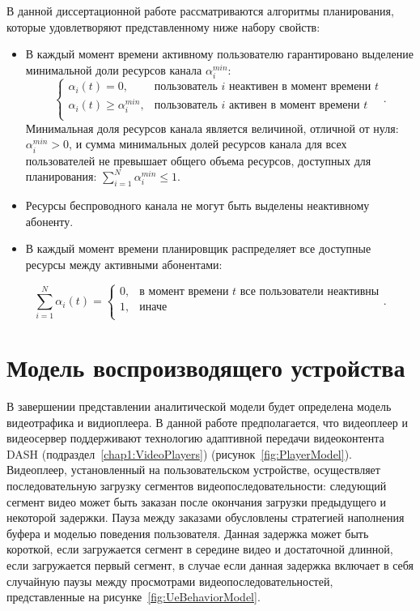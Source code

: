 В данной диссертационной работе рассматриваются алгоритмы планирования, которые удовлетворяют представленному ниже набору свойств:
\begin{itemize}
	\item В каждый момент времени активному пользователю гарантировано выделение минимальной доли ресурсов канала $\alpha_{i}^{min}$:
	\begin{equation}
		\label{eq:MinGuarPart}
		\begin{cases}
			\alpha_i(t) = 0, & \text{пользователь $i$ неактивен в момент времени $t$} \\
			\alpha_i(t) \geq \alpha_{i}^{min}, & \text{пользователь $i$ активен в момент времени $t$}\\
		\end{cases}.
	\end{equation}
	Минимальная доля ресурсов канала является величиной, отличной от нуля: $\alpha_{i}^{min} > 0$, и сумма минимальных долей ресурсов канала для всех пользователей не превышает общего объема ресурсов, доступных для планирования: $\sum\limits_{i=1}^{N}\alpha_{i}^{min} \leq 1$.
	\item Ресурсы беспроводного канала не могут быть выделены неактивному абоненту.
	\item В каждый момент времени планировщик распределяет все доступные ресурсы между активными абонентами:
\end{itemize}
\begin{equation}
	\label{eq:AllResources}
	\sum\limits_{i=1}^{N}\alpha_{i}(t) =
	\begin{cases}
		0, & \text{в момент времени $t$ все пользователи неактивны} \\
		1, & \text{иначе}\\
	\end{cases}.
\end{equation}

\section{Модель воспроизводящего устройства}
\label{chap2:VideoTrafficModel}

В завершении представлении аналитической модели будет определена модель видеотрафика и видиоплеера. В данной работе предполагается, что видеоплеер и видеосервер поддерживают технологию адаптивной передачи видеоконтента DASH (подраздел~\ref{chap1:VideoPlayers}) (рисунок~\ref{fig:PlayerModel}). Видеоплеер, установленный на пользовательском устройстве, осуществляет последовательную загрузку сегментов видеопоследовательности: следующий сегмент видео может быть заказан после окончания загрузки предыдущего и некоторой задержки. Пауза между заказами обусловлены стратегией наполнения буфера и моделью поведения пользователя. Данная задержка может быть короткой, если загружается сегмент в середине видео и достаточной длинной, если загружается первый сегмент, в случае если данная задержка включает в себя случайную паузы между просмотрами видеопоследовательностей, представленные на рисунке~\ref{fig:UeBehaviorModel}.

